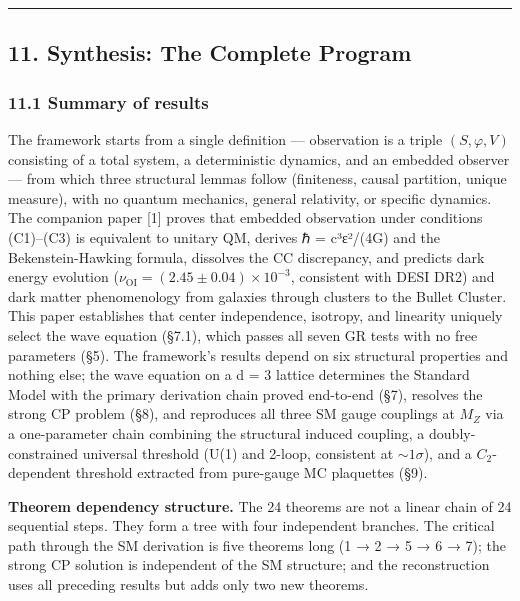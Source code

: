 \documentclass[
  11pt,
]{article}
\begin{document}
\begin{center}\rule{0.5\linewidth}{0.5pt}\end{center}

\hypertarget{synthesis-the-complete-program}{%
\subsection{11. Synthesis: The Complete
Program}\label{synthesis-the-complete-program}}

\hypertarget{summary-of-results}{%
\subsubsection{11.1 Summary of results}\label{summary-of-results}}

The framework starts from a single definition --- observation is a
triple \((S, \varphi, V)\) consisting of a total system, a deterministic
dynamics, and an embedded observer --- from which three structural
lemmas follow (finiteness, causal partition, unique measure), with no
quantum mechanics, general relativity, or specific dynamics. The
companion paper {[}1{]} proves that embedded observation under
conditions (C1)--(C3) is equivalent to unitary QM, derives ℏ = c³ε²/(4G)
and the Bekenstein-Hawking formula, dissolves the CC discrepancy, and
predicts dark energy evolution
(\(\nu_{\text{OI}} = (2.45 \pm 0.04) \times 10^{-3}\), consistent with
DESI DR2) and dark matter phenomenology from galaxies through clusters
to the Bullet Cluster. This paper establishes that center independence,
isotropy, and linearity uniquely select the wave equation (§7.1), which
passes all seven GR tests with no free parameters (§5). The framework's
results depend on six structural properties and nothing else; the wave
equation on a d = 3 lattice determines the Standard Model with the
primary derivation chain proved end-to-end (§7), resolves the strong CP
problem (§8), and reproduces all three SM gauge couplings at \(M_Z\) via
a one-parameter chain combining the structural induced coupling, a
doubly-constrained universal threshold (U(1) and 2-loop, consistent at
\(\sim 1\sigma\)), and a \(C_2\)-dependent threshold extracted from
pure-gauge MC plaquettes (§9).

\textbf{Theorem dependency structure.} The 24 theorems are not a linear
chain of 24 sequential steps. They form a tree with four independent
branches. The critical path through the SM derivation is five theorems
long (1 → 2 → 5 → 6 → 7); the strong CP solution is independent of the
SM structure; and the reconstruction uses all preceding results but adds
only two new theorems.
\end{document}
